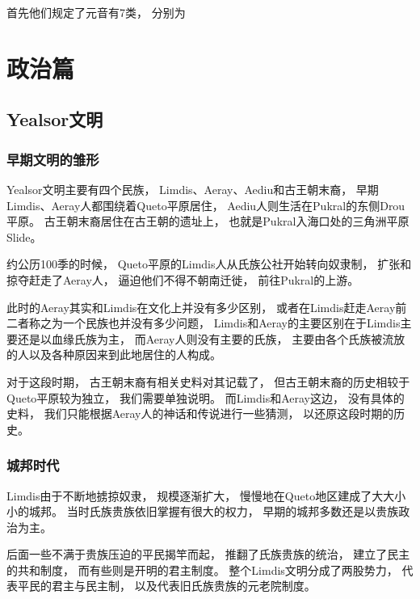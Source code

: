 \documentclass[UTF8,12pt,draft]{ctexbook}
\begin{document}
            首先他们规定了元音有7类，
            分别为

            

\part{政治篇}   
    \chapter{Yealsor文明}
        \section{早期文明的雏形}
            Yealsor文明主要有四个民族，
            Limdis、Aeray、Aediu和古王朝末裔，
            早期Limdis、Aeray人都围绕着Queto平原居住，
            Aediu人则生活在Pukral的东侧Drou平原。
            古王朝末裔居住在古王朝的遗址上，
            也就是Pukral入海口处的三角洲平原Slide。

            约公历100季的时候，
            Queto平原的Limdis人从氏族公社开始转向奴隶制，
            扩张和掠夺赶走了Aeray人，
            逼迫他们不得不朝南迁徙，
            前往Pukral的上游。

            此时的Aeray其实和Limdis在文化上并没有多少区别，
            或者在Limdis赶走Aeray前二者称之为一个民族也并没有多少问题，
            Limdis和Aeray的主要区别在于Limdis主要还是以血缘氏族为主，
            而Aeray人则没有主要的氏族，
            主要由各个氏族被流放的人以及各种原因来到此地居住的人构成。

            对于这段时期，
            古王朝末裔有相关史料对其记载了，
            但古王朝末裔的历史相较于Queto平原较为独立，
            我们需要单独说明。
            而Limdis和Aeray这边，
            没有具体的史料，
            我们只能根据Aeray人的神话和传说进行一些猜测，
            以还原这段时期的历史。
            
            
        \section{城邦时代}
            Limdis由于不断地掳掠奴隶，
            规模逐渐扩大，
            慢慢地在Queto地区建成了大大小小的城邦。
            当时氏族贵族依旧掌握有很大的权力，
            早期的城邦多数还是以贵族政治为主。

            后面一些不满于贵族压迫的平民揭竿而起，
            推翻了氏族贵族的统治，
            建立了民主的共和制度，
            而有些则是开明的君主制度。
            整个Limdis文明分成了两股势力，
            代表平民的君主与民主制，
            以及代表旧氏族贵族的元老院制度。
\end{document}
